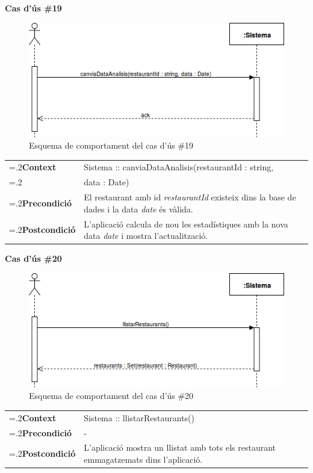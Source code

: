 \clearpage
\noindent\textbf{\large Cas d'ús \#19}\\
\begin{figure}[H]
\centering
\includegraphics[scale=0.6]{Figures/casdus_19.png}
\caption{Esquema de comportament del cas d'ús \#19}
\end{figure}
\begin{table}[h]
\noindent
\begin{tabularx}{\linewidth}{
>{\hsize=.2\hsize}X%
>{\hsize=0.8\hsize}X%
}
\textbf{Context} 		& Sistema :: canviaDataAnalisis(restaurantId : string,\\
						& data : Date) \\
\textbf{Precondició} 	& El restaurant amb id \textit{restaurantId} existeix dins la base de dades i la data \textit{date} és vàlida. \\
\textbf{Postcondició}	& L'aplicació calcula de nou les estadístiques amb la nova data \textit{date} i mostra l'actualització. \\
\end{tabularx}
\label{}
\end{table}

\noindent\textbf{\large Cas d'ús \#20}\\
\begin{figure}[H]
\centering
\includegraphics[scale=0.6]{Figures/casdus_20.png}
\caption{Esquema de comportament del cas d'ús \#20}
\end{figure}
\begin{table}[h]
\noindent
\begin{tabularx}{\linewidth}{
>{\hsize=.2\hsize}X%
>{\hsize=0.8\hsize}X%
}
\textbf{Context} 		& Sistema :: llistarRestaurants() \\
\textbf{Precondició} 	& - \\
\textbf{Postcondició}	& L'aplicació mostra un llistat amb tots els restaurant emmagatzemats dins l'aplicació. \\
\end{tabularx}
\label{}
\end{table}

